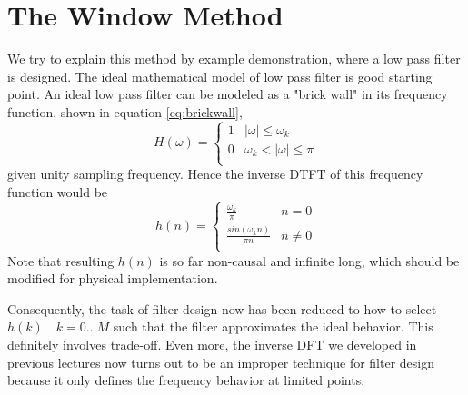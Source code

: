 \section*{The Window Method}
We try to explain this method by example demonstration, where a low pass 
filter is designed. The ideal mathematical model of low pass filter is good starting point. 
An ideal low pass filter can be modeled as a "brick wall" in its frequency function, shown in equation 
\ref{eq:brickwall},
\begin{equation}
  \label{eq:brickwall}
  H(\omega) = \left\{ \begin{array}{cc}
       1  &  |\omega| \leq \omega_k \\
       0  &  \omega_k < |\omega| \leq \pi \\
       \end{array} \right.
\end{equation}
given unity sampling frequency. Hence the inverse DTFT of this frequency 
function would be
\begin{equation}
  \label{eq:bwalltime}
  h(n) = \left\{ \begin{array}{cc}
       \frac{\omega_k}{\pi}  &  n=0 \\
       \frac{sin(\omega_k n)}{\pi n}  &  n \neq 0 \\
       \end{array} \right.
\end{equation}
Note that resulting $h(n)$ is so far non-causal and infinite long, which 
should be modified for physical implementation. 

Consequently, the task of filter design now has been reduced to 
how to select $h(k) \quad k=0 \dots M$ such that the filter approximates 
the ideal behavior. This definitely involves trade-off. Even more, 
the inverse DFT we developed in previous lectures now turns 
out to be an improper technique for filter design because 
it only defines the frequency behavior at limited points. 

